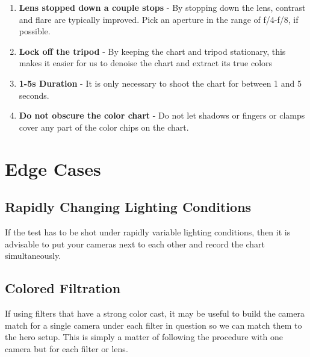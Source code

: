 \documentclass[twoside]{article}
\begin{document}
\begin{enumerate}
    \item \textbf{Lens stopped down a couple stops} - By stopping down the lens, contrast and flare are typically improved. Pick an aperture in the range of f/4-f/8, if possible.
    \item \textbf{Lock off the tripod} - By keeping the chart and tripod stationary, this makes it easier for us to denoise the chart and extract its true colors
    \item \textbf{1-5s Duration} - It is only necessary to shoot the chart for between 1 and 5 seconds.
    \item \textbf{Do not obscure the color chart} - Do not let shadows or fingers or clamps cover any part of the color chips on the chart.
\end{enumerate}

\newpage
\section{Edge Cases}
\subsection{Rapidly Changing Lighting Conditions}
If the test has to be shot under rapidly variable lighting conditions, then it is advisable to put your cameras next to each other and record the chart simultaneously.

\subsection{Colored Filtration}
If using filters that have a strong color cast, it may be useful to build the camera match for a single camera under each filter in question so we can match them to the hero setup. This is simply a matter of following the procedure with one camera but for each filter or lens.
\end{document}
